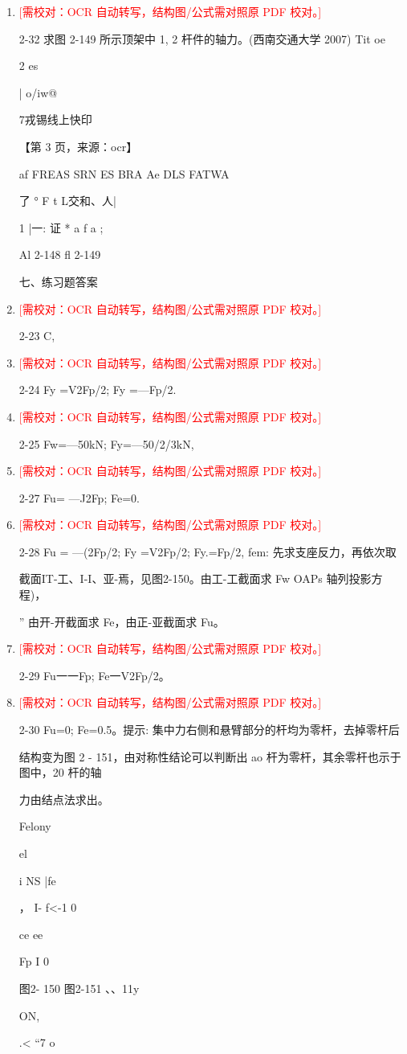 \documentclass[UTF8,12pt,a4paper,openany]{ctexbook}
\newcommand{\TODO}[1]{\textcolor{red}{[需校对：#1]}}
\begin{document}
\begin{enumerate}[label=\textbf{\arabic*.},leftmargin=2em]
\item \TODO{OCR 自动转写，结构图/公式需对照原 PDF 校对。}\par 2-32 求图 2-149 所示顶架中 1, 2 杆件的轴力。(西南交通大学 2007)         Tit oe\par 2 es\par |            o/iw@\par 7戎锡线上快印\par \par 【第 3 页，来源：ocr】\par af FREAS SRN ES BRA Ae DLS FATWA\par 了  °  F                   t L交和、人|\par 1 |一: 证  *  a  f  a  ;\par Al 2-148                    fl 2-149\par 七、练习题答案
\item \TODO{OCR 自动转写，结构图/公式需对照原 PDF 校对。}\par 2-23 C,
\item \TODO{OCR 自动转写，结构图/公式需对照原 PDF 校对。}\par 2-24 Fy =V2Fp/2; Fy =—Fp/2.
\item \TODO{OCR 自动转写，结构图/公式需对照原 PDF 校对。}\par 2-25 Fw=—50kN; Fy=—50/2/3kN,
\item \TODO{OCR 自动转写，结构图/公式需对照原 PDF 校对。}\par 2-27 Fu= —J2Fp; Fe=0.
\item \TODO{OCR 自动转写，结构图/公式需对照原 PDF 校对。}\par 2-28 Fu = —(2Fp/2; Fy =V2Fp/2; Fy.=Fp/2, fem: 先求支座反力，再依次取\par 截面IT-工、I-I、亚-焉，见图2-150。由工-工截面求 Fw OAPs 轴列投影方程)，\par ” 由开-开截面求 Fe，由正-亚截面求 Fu。
\item \TODO{OCR 自动转写，结构图/公式需对照原 PDF 校对。}\par 2-29 Fu一一Fp; Fe一V2Fp/2。
\item \TODO{OCR 自动转写，结构图/公式需对照原 PDF 校对。}\par 2-30 Fu=0; Fe=0.5。提示: 集中力右侧和悬臂部分的杆均为零杆，去掉零杆后\par 结构变为图 2 - 151，由对称性结论可以判断出 ao 杆为零杆，其余零杆也示于图中，20 杆的轴\par 力由结点法求出。\par Felony\par el\par i    NS                |fe\par ，      I-       f<-1                0\par ce    ee\par Fp            I               0\par 图2- 150                 图2-151               、、11y\par ON,\par .<     “7 o

\end{enumerate}
\end{document}
